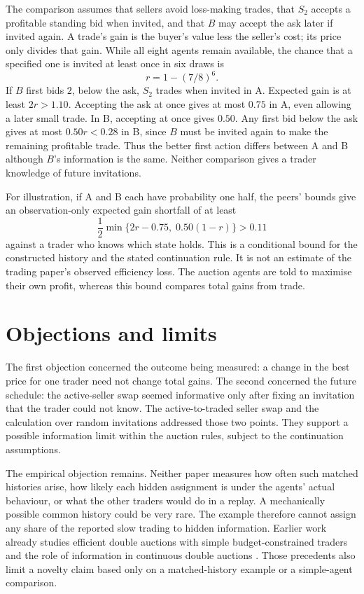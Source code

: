 \documentclass{article}
\begin{document}
The comparison assumes that sellers avoid loss-making trades, that \(S_2\) accepts a profitable standing bid when
invited, and that \(B\) may accept the ask later if invited again. A trade's gain is the buyer's value less the
seller's cost; its price only divides that gain. While all eight agents remain available, the chance that a specified
one is invited at least once in six draws is
\[
r=1-(7/8)^6.
\]
If \(B\) first bids \(2\), below the ask, \(S_2\) trades when invited in A. Expected gain is at least \(2r>1.10\).
Accepting the ask at once gives at most \(0.75\) in A, even allowing a later small trade. In B, accepting at once
gives \(0.50\). Any first bid below the ask gives at most \(0.50r<0.28\) in B, since \(B\) must be invited again to
make the remaining profitable trade. Thus the better first action differs between A and B although \(B\)'s information
is the same. Neither comparison gives a trader knowledge of future invitations.

For illustration, if A and B each have probability one half, the peers' bounds give an observation-only expected gain
shortfall of at least
\[
\frac{1}{2}\min\{2r-0.75,\;0.50(1-r)\}>0.11
\]
against a trader who knows which state holds. This is a conditional bound for the constructed history and the stated
continuation rule. It is not an estimate of the trading paper's observed efficiency loss. The auction agents are told
to maximise their own profit, whereas this bound compares total gains from trade.

\section{Objections and limits}

The first objection concerned the outcome being measured: a change in the best price for one trader need not change
total gains. The second concerned the future schedule: the active-seller swap seemed informative only after fixing an
invitation that the trader could not know. The active-to-traded seller swap and the calculation over random
invitations addressed those two points. They support a possible information limit within the auction rules, subject to
the continuation assumptions.

The empirical objection remains. Neither paper measures how often such matched histories arise, how likely each hidden
assignment is under the agents' actual behaviour, or what the other traders would do in a replay. A mechanically
possible common history could be very rare. The example therefore cannot assign any share of the reported slow trading
to hidden information. Earlier work already studies efficient double auctions with simple budget-constrained traders
\cite{gode1993} and the role of information in continuous double auctions \cite{anufriev2022,anufrievLimited}. Those
precedents also limit a novelty claim based only on a matched-history example or a simple-agent comparison.
\end{document}
